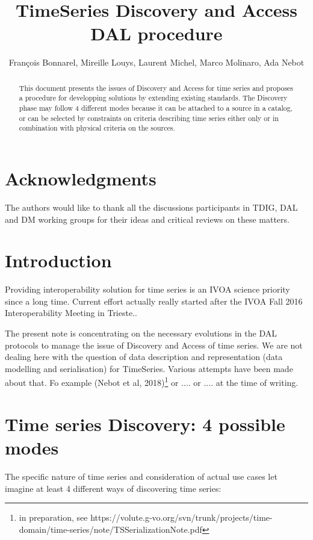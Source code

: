 \documentclass[11pt,a4paper]{ivoa}
\title{TimeSeries Discovery and Access \\ DAL procedure}
\author{Fran\c cois Bonnarel, Mireille Louys, Laurent Michel, Marco Molinaro, Ada Nebot}
\begin{document}
\begin{abstract}
This document presents the issues of  Discovery and Access for time series and proposes a procedure for developping solutions by extending existing standards. The Discovery phase may follow 4 different modes because it can be attached to a source in a catalog, or can be selected by constraints on criteria describing time series either only or in combination with physical criteria on the sources.   


\end{abstract}

\section*{Acknowledgments}
The authors would like to thank all the discussions participants in TDIG, DAL and DM working groups for their ideas and critical reviews on these matters. 
\section{Introduction}

    Providing interoperability solution for time series is an IVOA science priority since a long time.  Current effort actually really started after the IVOA Fall 2016 Interoperability Meeting in Trieste..
    
The present note is concentrating on the necessary evolutions in the DAL protocols to manage the issue of Discovery and Access of time series.  
We are not dealing here with the question of data description and representation (data modelling and serialisation) for TimeSeries. Various attempts have been made about that. Fo example 
(Nebot et al, 2018)\footnote{in preparation, see https://volute.g-vo.org/svn/trunk/projects/time-domain/time-series/note/TSSerializationNote.pdf} or .... or .... at the time of writing.


\section{Time series Discovery: 4 possible modes}

The specific nature of time series and consideration of actual use cases let imagine at least 4 different ways of discovering time series:
\end{document}
